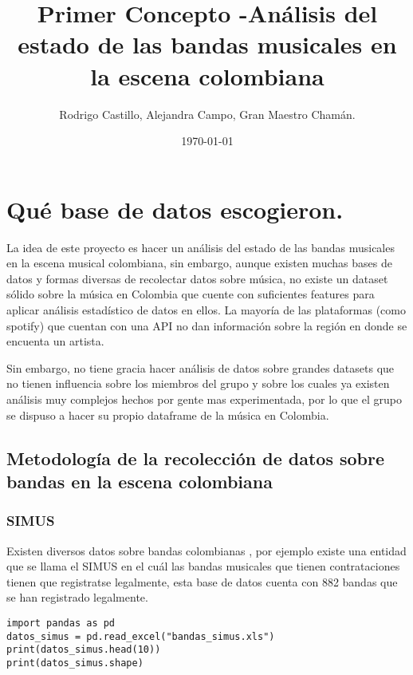 \documentclass[11pt]{article}
\author{Rodrigo Castillo, Alejandra Campo, Gran Maestro Chamán.}
\date{\today}
\title{Primer Concepto -Análisis del estado de las bandas musicales en la escena colombiana}
\begin{document}
\maketitle
\tableofcontents



\section{Qué base de datos escogieron.}
\label{sec:org349f8b3}
La idea de este proyecto es hacer un análisis del estado de las bandas musicales
en la escena musical colombiana, sin embargo, aunque existen muchas bases de
datos y formas diversas
de recolectar datos sobre música, no existe un dataset sólido sobre la música en
Colombia que cuente con suficientes features para aplicar análisis estadístico
de datos en ellos. La mayoría de las plataformas (como spotify) que cuentan con
una API no dan información sobre la región en donde se encuenta un artista.

Sin embargo, no tiene gracia hacer análisis de datos sobre grandes datasets que
no tienen influencia sobre los miembros del grupo y sobre los cuales ya existen
análisis muy complejos hechos por gente mas experimentada, por lo que el grupo
se dispuso a hacer su propio dataframe de la música en Colombia.

\subsection{Metodología de la recolección de datos sobre bandas en la escena colombiana}
\label{sec:org3df0bc2}
\subsubsection{SIMUS}
\label{sec:org132f07d}
Existen diversos datos sobre bandas colombianas , por ejemplo existe una entidad que se llama el SIMUS en el cuál las bandas musicales que tienen contrataciones tienen que registratse legalmente, esta base de datos cuenta con 882 bandas que se han registrado legalmente.
\begin{verbatim}
import pandas as pd
datos_simus = pd.read_excel("bandas_simus.xls")
print(datos_simus.head(10))
print(datos_simus.shape)
\end{verbatim}
\end{document}
